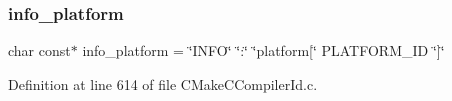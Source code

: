 \subsubsection{\texorpdfstring{info\+\_\+platform}{info\_platform}}
{\footnotesize\ttfamily char const$\ast$ info\+\_\+platform = \char`\"{}I\+N\+FO\char`\"{} \char`\"{}\+:\char`\"{} \char`\"{}platform\mbox{[}\char`\"{} P\+L\+A\+T\+F\+O\+R\+M\+\_\+\+ID \char`\"{}\mbox{]}\char`\"{}}



Definition at line 614 of file C\+Make\+C\+Compiler\+Id.\+c.

